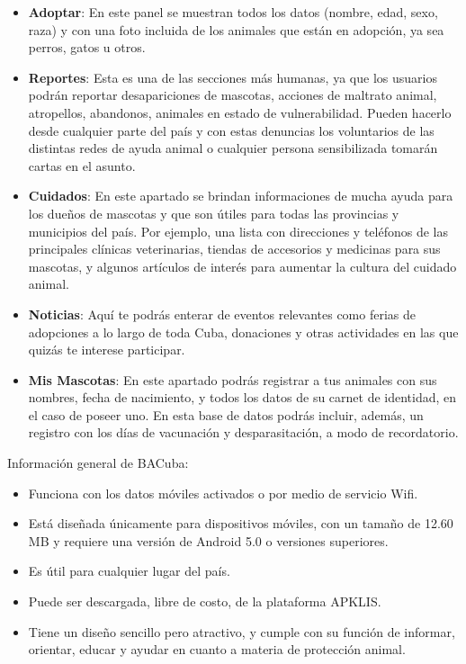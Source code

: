 \begin{itemize}
\item \textbf {Adoptar}: En este panel se muestran todos los datos (nombre, edad, sexo, raza) y con una foto incluida de los animales que están en adopción, ya sea perros, gatos u otros.
\item \textbf{ Reportes}: Esta es una de las secciones más humanas, ya que los usuarios podrán reportar desapariciones de mascotas, acciones de maltrato animal, atropellos, abandonos, animales en estado de vulnerabilidad. Pueden hacerlo desde cualquier parte del país y con estas denuncias los voluntarios de las distintas redes de ayuda animal o cualquier persona sensibilizada tomarán cartas en el asunto.
\item \textbf{Cuidados}: En este apartado se brindan informaciones de mucha ayuda para los dueños de mascotas y que son útiles para todas las provincias y municipios del país. Por ejemplo, una lista con direcciones y teléfonos de las principales clínicas veterinarias, tiendas de accesorios y medicinas para sus mascotas, y algunos artículos de interés para aumentar la cultura del cuidado animal.
\item \textbf{Noticias}: Aquí te podrás enterar de eventos relevantes como ferias de adopciones a lo largo de toda Cuba, donaciones y otras actividades en las que quizás te interese participar.
\item \textbf{Mis Mascotas}: En este apartado podrás registrar a tus animales con sus nombres, fecha de nacimiento, y todos los datos de su carnet de identidad, en el caso de poseer uno. En esta base de datos podrás incluir, además, un registro con los días de vacunación y desparasitación, a modo de recordatorio.
\end{itemize}

Información general de BACuba:


\begin{itemize}
\item Funciona con los datos móviles activados o por medio de servicio Wifi.
\item Está diseñada únicamente para dispositivos móviles, con un tamaño de 12.60 MB y requiere una versión de Android 5.0 o versiones superiores.
\item Es útil para cualquier lugar del país.
\item Puede ser descargada, libre de costo, de la plataforma APKLIS.
\item Tiene un diseño sencillo pero atractivo, y cumple con su función de informar, orientar, educar y ayudar en cuanto a materia de protección animal.
\end{itemize}

